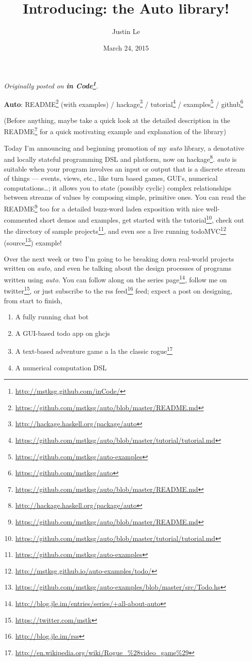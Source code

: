 \documentclass[]{article}
\title{Introducing: the Auto library!}
\author{Justin Le}
\date{March 24, 2015}
\renewcommand{\href}[2]{#2\footnote{\url{#1}}}
\begin{document}
\maketitle

\emph{Originally posted on
\textbf{\href{http://mstksg.github.com/inCode/}{in Code}}.}

\textbf{Auto}:
\href{https://github.com/mstksg/auto/blob/master/README.md}{README}
(with examples) /
\href{http://hackage.haskell.org/package/auto}{hackage} /
\href{https://github.com/mstksg/auto/blob/master/tutorial/tutorial.md}{tutorial}
/ \href{https://github.com/mstksg/auto-examples}{examples} /
\href{https://github.com/mstksg/auto}{github}

(Before anything, maybe take a quick look at the detailed description in
the \href{https://github.com/mstksg/auto/blob/master/README.md}{README}
for a quick motivating example and explanation of the library)

Today I'm announcing and beginning promotion of my \emph{auto} library,
a denotative and locally stateful programming DSL and platform, now
\href{http://hackage.haskell.org/package/auto}{on hackage}. \emph{auto}
is suitable when your program involves an input or output that is a
discrete stream of things --- events, views, etc., like turn based
games, GUI's, numerical computations\ldots{}; it allows you to state
(possibly cyclic) complex relationships between streams of values by
composing simple, primitive ones. You can read the
\href{https://github.com/mstksg/auto/blob/master/README.md}{README} too
for a detailed buzz-word laden exposition with nice well-commented short
demos and examples, get started with
\href{https://github.com/mstksg/auto/blob/master/tutorial/tutorial.md}{the
tutorial}, check out the directory of
\href{https://github.com/mstksg/auto-examples}{sample projects}, and
even see a live running
\href{http://mstksg.github.io/auto-examples/todo/}{todoMVC}
(\href{https://github.com/mstksg/auto-examples/blob/master/src/Todo.hs}{source})
example!

Over the next week or two I'm going to be breaking down real-world
projects written on \emph{auto}, and even be talking about the design
processes of programs written using \emph{auto}. You can follow along on
\href{http://blog.jle.im/entries/series/+all-about-auto}{the series
page}, follow me on \href{https://twitter.com/mstk}{twitter}, or just
subscribe to the \href{http://blog.jle.im/rss}{rss feed} feed; expect a
post on designing, from start to finish,

\begin{enumerate}
\def\labelenumi{\arabic{enumi}.}
\tightlist
\item
  A fully running chat bot
\item
  A GUI-based todo app on ghcjs
\item
  A text-based adventure game a la the classic
  \href{http://en.wikipedia.org/wiki/Rogue_\%28video_game\%29}{rogue}
\item
  A numerical computation DSL
\end{enumerate}
\end{document}
